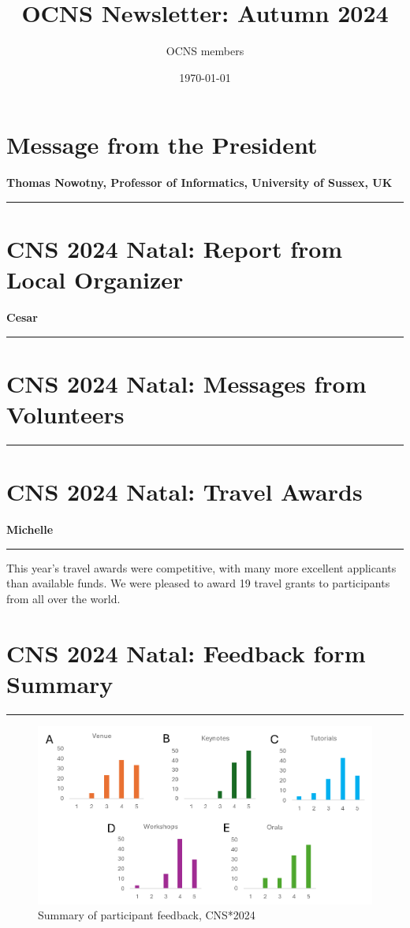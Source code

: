 \documentclass[11pt,a4paper,oneside]{article}
\title{OCNS Newsletter: Autumn 2024}
\author{OCNS members}
\date{\today}
\begin{document}
\pagestyle{fancy}
\fancyhead{}
\fancyfoot{}
\maketitle
\newpage

\pagestyle{fancy}
\fancyhead{}
\fancyfoot{}

\newpage
\section*{Message from the President}%
\textbf{\large Thomas Nowotny, Professor of Informatics, University of Sussex, UK\\}
\rule{\textwidth}{0.4pt}

\lipsum[1-3]

\newpage
\section*{CNS 2024 Natal: Report from Local Organizer}%
\textbf{\large Cesar\\}
\rule{\textwidth}{0.4pt}
\lipsum[1-3]

\newpage
\section*{CNS 2024 Natal: Messages from Volunteers}%
\rule{\textwidth}{0.4pt}
\lipsum[1-3]

\newpage
\section*{CNS 2024 Natal: Travel Awards}%
\textbf{\large Michelle\\}
\rule{\textwidth}{0.4pt}
This year's travel awards were competitive, with many more excellent applicants than available funds.
We were pleased to award 19 travel grants to participants from all over the world.

\newpage
\section*{CNS 2024 Natal: Feedback form Summary}%
\rule{\textwidth}{0.4pt}
\begin{figure}[h]
  \centering
  \includegraphics[width=\textwidth]{images/cns2024-feedback-form-summary}
  \caption{Summary of participant feedback, CNS*2024}%
  \label{fig:cns2024-summary}
\end{figure}
\end{document}
